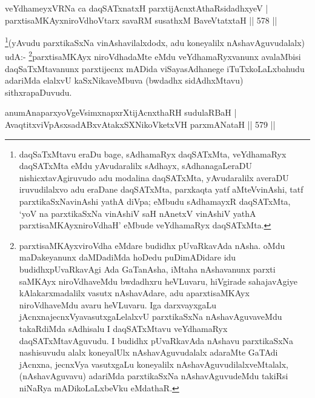 \begin{shl}
veYdhameyxVRNa ca daqSATxnatxH parxtijAcnxtAthaRsidadhxyeV | \\
parxtisaMKAyxniroVdhoV\s tarx savaRM susathxM BaveVtatxtaH \hfill||  578 ||  
\end{shl}

\begin{artha}
\footnote{daqSaTxMtavu eraDu bage, sAdhamaRyx daqSATxMta, veYdhamaRyx daqSATxMta eMdu yAvudaralilx sAdhayx, sAdhanagaLeraDU nishicxtavAgiruvudo adu modalina daqSATxMta, yAvudaralilx averaDU iruvudilalxvo adu eraDane daqSATxMta, parxkaqta yatf aMteVvinAshi, tatf parxtikaSxNavinAshi yathA diVpa; eMbudu sAdhamayxR daqSATxMta, `yoV na parxtikaSxNa vinAshiV saH nAnetxV vinAshiV yathA parxtisaMKAyxniroVdhaH' eMbude veYdhamaRyx daqSATxMta.}(yAvudu parxtikaSxNa vinAshavilalxdodx, adu koneyalilx nAshavAguvudalalx) udA:- \footnote{parxtisaMKAyxviroVdha eMdare budidhx pUvaRkavAda nAsha. oMdu maDakeyanunx daMDadiMda hoDedu puDimADidare idu budidhxpUvaRkavAgi Ada GaTanAsha, iMtaha nAshavanunx parxti saMKAyx niroVdhaveMdu bwdadhxru heVLuvaru, hiVgirade sahajavAgiye kAlakarxmadalilx vasutx nAshavAdare, adu aparxtisaMKAyx niroVdhaveMdu avaru heVLuvaru. Iga darxvayxgaLu jAcnxnajecnxVyavasutxgaLelalxvU parxtikaSxNa nAshavAguvaveMdu takaRdiMda sAdhisalu I daqSATxMtavu veYdhamaRyx daqSATxMtavAguvudu. I budidhx pUvaRkavAda nAshavu parxtikaSxNa nashisuvudu alalx koneyalUlx nAshavAguvudalalx adaraMte GaTAdi jAcnxna, jecnxVya vasutxgaLu koneyalilx nAshavAguvudilalxveMtalalx, (nAshavAguvavu) adariMda parxtikaSxNa nAshavAguvudeMdu takiRsi niNaRya mADikoLaLxbeVku eMdathaR.}parxtisaMKAyx niroVdhadaMte eMdu veYdhamaRyxvanunx avalaMbisi daqSaTxMtavanunx parxtijecnx mADida viSayasAdhanege iTuTxkoLaLxbahudu adariMda elalxvU kaSxNikaveMbuva (bwdadhx sidAdhxMtavu) sithxrapaDuvudu.
\end{artha}

\begin{shl}
anumAnaparxyoVgeV\s simxnapxrXtijAcnxthaRH sudulaRBaH | \\
\footnotemark[3]AvaqtitxviVpAsxsadABxvAtakxSXNikoVketxVH parxmANataH \hfill||  579 ||  
\end{shl}

